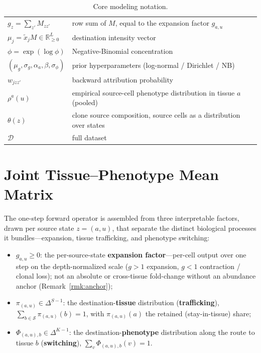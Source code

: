 \documentclass[11pt]{article}
\newcommand{\Reals}{\mathbb{R}}
\newcommand{\Ssp}{\mathcal{S}}                    %
\newcommand{\Dsp}{\mathcal{D}}                    %
\newcommand{\simplex}[1]{\Delta^{#1}}
\theoremstyle{definition}
\begin{document}
\begin{table}[h]
\begin{tabular}{@{}ll@{}}
$g_z = \sum_{z'} M_{zz'}$    & row sum of $M$, equal to the expansion factor $g_{a,u}$\\
$\mu_j = \tilde{x}_j M \in \Reals_{\geq 0}^{L}$ & destination intensity vector\\
$\phi=\exp(\log\phi)$        & Negative-Binomial concentration\\
$(\mu_g,\sigma_g,\alpha_a,\beta,\sigma_\phi)$ & prior hyperparameters (log-normal / Dirichlet / NB)\\
$w_{jzz'}$                   & backward attribution probability\\
$\rho^a(u)$                  & empirical source-cell phenotype distribution in tissue $a$ (pooled)\\
$\theta(z)$                  & clone source composition, source cells as a distribution over states\\
$\Dsp$                       & full dataset\\
\bottomrule
\end{tabular}
\caption{Core modeling notation.}
\label{tab:notation}
\end{table}

\section{Joint Tissue--Phenotype Mean Matrix}

\label{sec:expansion-factors}

The one-step forward operator is assembled from three interpretable factors,
drawn per source state $z=(a,u)$, that separate the distinct biological processes
it bundles---expansion, tissue trafficking, and phenotype switching:
\begin{itemize}[leftmargin=1.4em, itemsep=2pt]
  \item $g_{a,u} \geq 0$: the per-source-state \textbf{expansion factor}---per-cell
        output over one step on the depth-normalized scale ($g>1$ expansion, $g<1$
        contraction / clonal loss); not an absolute or cross-tissue fold-change
        without an abundance anchor (Remark~\ref{rmk:anchor});
  \item $\pi_{(a,u)} \in \simplex{S-1}$: the destination-\textbf{tissue}
        distribution (\textbf{trafficking}), $\sum_{b\in\Ssp}\pi_{(a,u)}(b)=1$,
        with $\pi_{(a,u)}(a)$ the retained (stay-in-tissue) share;
  \item $\Phi_{(a,u),b}\in\simplex{K-1}$: the destination-\textbf{phenotype}
        distribution along the route to tissue $b$ (\textbf{switching}),
        $\sum_{v}\Phi_{(a,u),b}(v)=1$.
\end{itemize}
\end{document}
